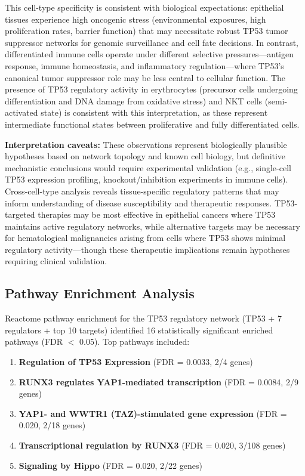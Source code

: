 \documentclass[11pt]{article}
\begin{document}
This cell-type specificity is consistent with biological expectations: epithelial tissues experience high oncogenic stress (environmental exposures, high proliferation rates, barrier function) that may necessitate robust TP53 tumor suppressor networks for genomic surveillance and cell fate decisions. In contrast, differentiated immune cells operate under different selective pressures---antigen response, immune homeostasis, and inflammatory regulation---where TP53's canonical tumor suppressor role may be less central to cellular function. The presence of TP53 regulatory activity in erythrocytes (precursor cells undergoing differentiation and DNA damage from oxidative stress) and NKT cells (semi-activated state) is consistent with this interpretation, as these represent intermediate functional states between proliferative and fully differentiated cells.

\textbf{Interpretation caveats:} These observations represent biologically plausible hypotheses based on network topology and known cell biology, but definitive mechanistic conclusions would require experimental validation (e.g., single-cell TP53 expression profiling, knockout/inhibition experiments in immune cells). Cross-cell-type analysis reveals tissue-specific regulatory patterns that may inform understanding of disease susceptibility and therapeutic responses. TP53-targeted therapies may be most effective in epithelial cancers where TP53 maintains active regulatory networks, while alternative targets may be necessary for hematological malignancies arising from cells where TP53 shows minimal regulatory activity---though these therapeutic implications remain hypotheses requiring clinical validation.

\subsection{Pathway Enrichment Analysis}

Reactome pathway enrichment for the TP53 regulatory network (TP53 + 7 regulators + top 10 targets) identified 16 statistically significant enriched pathways (FDR $<$ 0.05). Top pathways included:

\begin{enumerate}
\item \textbf{Regulation of TP53 Expression} (FDR = 0.0033, 2/4 genes)
\item \textbf{RUNX3 regulates YAP1-mediated transcription} (FDR = 0.0084, 2/9 genes)
\item \textbf{YAP1- and WWTR1 (TAZ)-stimulated gene expression} (FDR = 0.020, 2/18 genes)
\item \textbf{Transcriptional regulation by RUNX3} (FDR = 0.020, 3/108 genes)
\item \textbf{Signaling by Hippo} (FDR = 0.020, 2/22 genes)
\end{enumerate}
\end{document}
